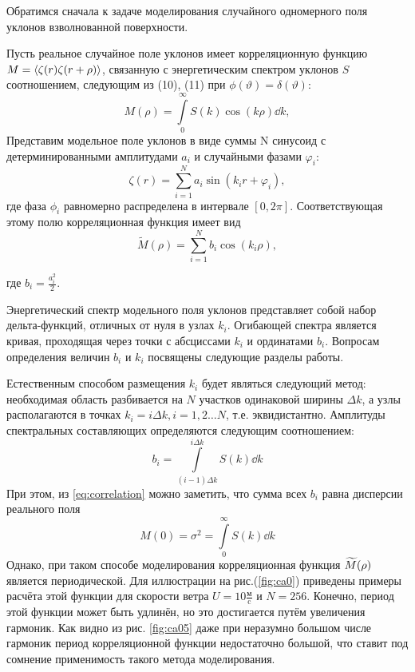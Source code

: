 Обратимся сначала к задаче моделирования случайного одномерного поля уклонов взволнованной поверхности. 

Пусть реальное случайное поле уклонов имеет корреляционную функцию $M=\langle\zeta(r) \zeta(r+\rho)\rangle$, связанную с энергетическим спектром уклонов $S$ соотношением, следующим из (10), (11) при $\phi(\vartheta)=\delta(\vartheta)$:
\begin{equation}
	\label{eq:correlation}
	M(\rho)= \int\limits_0^{\infty} S(k)\cos(k \rho) \dd{k}, 
\end{equation}
Представим модельное поле уклонов в виде суммы N синусоид с детерминированными амплитудами $a_i$ и случайными фазами $\varphi_i$:
\begin{equation}
	\zeta(r)=\sum_{i=1}^N a_i \sin(k_ir+\varphi_i), 
\end{equation}
где фаза $\phi_i$ равномерно распределена в интервале $[0,2\pi]$. Соответствующая этому полю корреляционная функция имеет вид
\begin{equation}
	\widetilde M(\rho)=\sum\limits_{i=1}^N b_i \cos(k_i \rho),
\end{equation}

где $b_i=\frac{a_i^2}{2}$.

Энергетический спектр модельного поля уклонов представляет собой набор дельта-функций, отличных от нуля в узлах $k_i$. Огибающей спектра является кривая, проходящая через точки с абсциссами $k_i$ и ординатами $b_i$. Вопросам определения величин $b_i$ и $k_i$ 
посвящены следующие разделы работы.

Естественным способом размещения $k_i$ будет являться следующий метод:
необходимая область разбивается на $N$ участков одинаковой ширины $\Delta k$, а узлы располагаются в точках $k_i=i \Delta k, i=1,2\dots N$, т.е. эквидистантно.
Амплитуды спектральных составляющих определяются следующим соотношением:
\begin{equation}
	b_i = \int\limits_{(i-1)\Delta k}^{i \Delta k} S(k) \dd{k}
\end{equation}
При этом, из \eqref{eq:correlation} можно заметить, что сумма всех $b_i$ равна дисперсии реального поля
\begin{equation}
	M(0)=\sigma^2=\int\limits_0^{\infty} S(k) \dd{k}
\end{equation}
Однако, при таком способе моделирования корреляционная функция $\widetilde{M}(\rho)$ является
периодической. Для иллюстрации на рис.(\ref{fig:ca0}) приведены примеры расчёта этой функции для скорости ветра $U=10 \frac{\text{м}}{\text{c}}$ и $N=256$. Конечно, период этой функции может быть удлинён, но это достигается путём увеличения гармоник.
Как видно из рис. \ref{fig:ca05} даже при неразумно большом числе гармоник период корреляционной функции недостаточно большой, что ставит под сомнение применимость такого метода моделирования.

